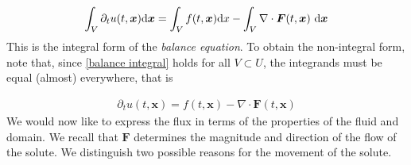 \documentclass[
    a4paper,
    DIV=14,
    abstract=true,
    numbers=noenddot
]{scrartcl}
\begin{document}
\begin{align}\label{balance integral}
	\int_{V}\partial _t u(t,\bm{x} )  \mathrm{d} \bm{x} = \int_{V}f(t,\bm{x} ) \mathrm{d} x -\int_{V}  \nabla \cdot  \bm{F}(t, \bm{x})\   \mathrm{d}  \bm{x}\end{align}
This is the integral form of the \emph{balance equation}. To obtain the non-integral form, note that, since \eqref{balance integral} holds for all $V \subset  U$, the integrands must be equal (almost) everywhere, that is

\begin{align}\label{balance}
	\partial _t u(t,\bm{x} )   = f(t,\bm{x})-\nabla \cdot  \bm{F}(t, \bm{x})\end{align}
We would now like to express the flux in terms of the properties of the fluid and domain. We recall that $\bm{F} $ determines the magnitude and direction of the flow of the solute. We distinguish two possible reasons for the movement of the solute.
\end{document}
